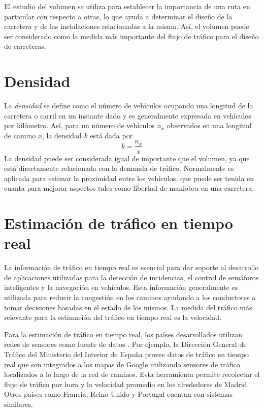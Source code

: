 El estudio del volumen se utiliza para establecer la importancia de una ruta en particular con respecto a otras, lo que ayuda a determinar el diseño de la carretera y de las instalaciones relacionadas a la misma. Así, el volumen puede ser considerado como la medida más importante del flujo de tráfico para el diseño de carreteras.

\section{Densidad}

La \emph{densidad} se define como el número de vehículos ocupando una longitud de la carretera o carril en un instante dado y es generalmente expresada en vehículos por kilómetro. Así, para un número de vehículos $n_{x}$ observados en una longitud de camino $x$, la densidad $k$ está dada por
\begin{equation}
k=\frac { { n }_{ x } }{ x }
\end{equation}
La densidad puede ser considerada igual de importante que el volumen, ya que está directamente relacionada con la demanda de tráfico. Normalmente es aplicada para estimar la proximidad entre los vehículos, que puede ser tenida en cuanta para mejorar aspectos tales como libertad de maniobra en una carretera.

\section{Estimación de tráfico en tiempo real}

La información de tráfico en tiempo real es esencial para dar soporte al desarrollo de aplicaciones utilizadas para la detección de incidencias, el control de semáforos inteligentes y la navegación en vehículos. Esta información generalmente es utilizada para reducir la congestión en los caminos ayudando a los conductores a tomar decisiones basadas en el estado de los mismos. La medida del tráfico más relevante para la estimación del tráfico en tiempo real es la velocidad.

Para la estimación de tráfico en tiempo real, los países desarrollados utilizan redes de sensores como fuente de datos \cite{leduc2008road}. Por ejemplo, la Dirección General de Tráfico del Ministerio del Interior de España provee datos de tráfico en tiempo real que son  integrados a los mapas de Google utilizando sensores de tráfico localizados a lo largo de la red de caminos. Esta herramienta permite recolectar el flujo de tráfico por hora y la velocidad promedio en los alrededores de Madrid. Otros países como Francia, Reino Unido y Portugal cuentan con sistemas similares.


